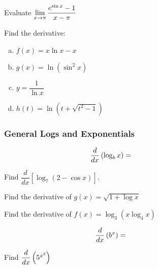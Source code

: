\documentclass[notes]{subfiles}
\begin{document}
		\begin{ex}
			Evaluate \(\displaystyle \lim_{x\to \pi} \dfrac{e^{\sin x} - 1}{x-\pi}\)
		\end{ex}
			
			\newpage
			
		\begin{ex}
		Find the derivative:
			\begin{enumerate}[(a)]
				\item \(f(x) = x\ln x - x\)
					
				\item \(g(x) = \ln (\sin^2x)\)
					
				\item \(y = \dfrac{1}{\ln x}\)
					
				\item \(h(t) = \ln(t + \sqrt{t^2-1})\)
			\end{enumerate}
		\end{ex}
			\newpage
			
	\subsubsection*{General Logs and Exponentials}
		\begin{rmk}
			\[\dfrac{d}{dx}\left( \log_b x\right) = \qquad \qquad \qquad\]
		\end{rmk}
		
		\begin{pf}
			\vs{.75}
		\end{pf}
		
		\begin{ex}
			Find \(\dfrac{d}{dx} [\log_7(2-\cos x)]\).
		\end{ex}
			\vs{1}
			
		\begin{ex}
			Find the derivative of \(g(x) = \sqrt{1+\log x}\)
		\end{ex}
			\vs{1}
			
		\begin{ex}
			Find the derivative of \(f(x) = \log_3(x\log_4x)\)
		\end{ex}
			\vs{1}
			\newpage
			
		\begin{rmk}
			\[\dfrac{d}{dx} \left( b^x\right) = \qquad\qquad\qquad\]
		\end{rmk}
		
		\begin{ex}
			Find \(\dfrac{d}{dx}\left( 5^{x^3}\right)\)
		\end{ex}	
			
\end{document}
